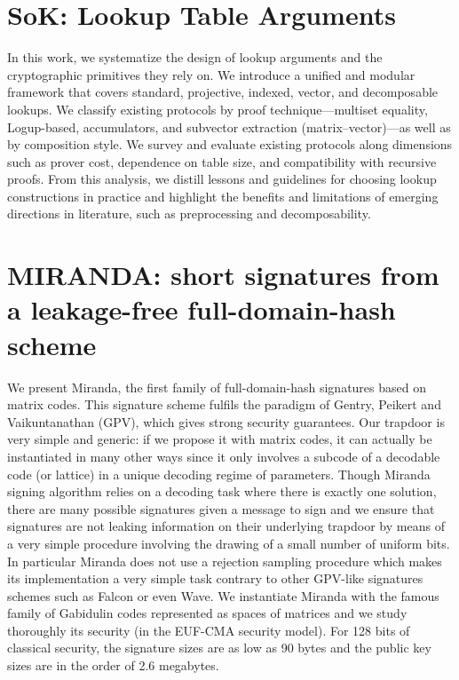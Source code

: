 \documentclass[11pt,oneside]{book}
\theoremstyle{definition}
\theoremstyle{remark}
\theoremstyle{plain}
\begin{document}
\section{\cite{cryptoeprint:2025/1876} SoK: Lookup Table Arguments}
In this work, we systematize the design of lookup arguments and the cryptographic primitives they rely on. We introduce a unified and modular framework that covers standard, projective, indexed, vector, and decomposable lookups. We classify existing protocols by proof technique—multiset equality, Logup-based, accumulators, and subvector extraction (matrix–vector)—as well as by composition style. We survey and evaluate existing protocols along dimensions such as prover cost, dependence on table size, and compatibility with recursive proofs. From this analysis, we distill lessons and guidelines for choosing lookup constructions in practice and highlight the benefits and limitations of emerging directions in literature, such as preprocessing and decomposability.

\section{\cite{cryptoeprint:2025/1878} MIRANDA: short signatures from a leakage-free full-domain-hash scheme}
We present Miranda, the first family of full-domain-hash signatures based on matrix codes. This signature scheme fulfils the paradigm of Gentry, Peikert and Vaikuntanathan (GPV), which gives strong security guarantees. Our trapdoor is very simple and generic: if we propose it with matrix codes, it can actually be instantiated in many other ways since it only involves a subcode of a decodable code (or lattice) in a unique decoding regime of parameters. Though Miranda signing algorithm relies on a decoding task where there is exactly one solution, there are many possible signatures given a message to sign and we ensure that signatures are not leaking information on their underlying trapdoor by means of a very simple procedure involving the drawing of a small number of uniform bits. In particular Miranda does not use a rejection sampling procedure which makes its implementation a very simple task contrary to other GPV-like signatures schemes such as Falcon or even Wave. We instantiate Miranda with the famous family of Gabidulin codes represented as spaces of matrices and we study thoroughly its security (in the EUF-CMA security model). For 128 bits of classical security, the signature sizes are as low as 90 bytes and the public key sizes are in the order of 2.6 megabytes.
\end{document}

